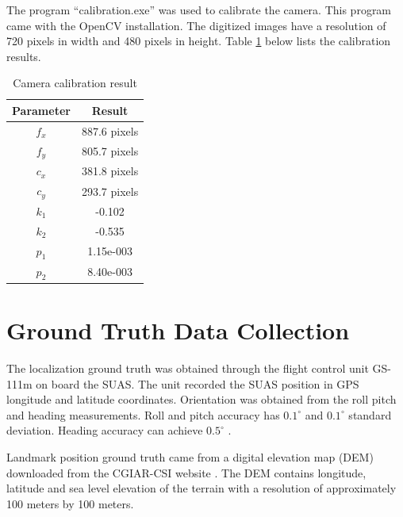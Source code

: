 The program ``calibration.exe'' was used to calibrate the camera. This
program came with the OpenCV installation. The digitized images have a
resolution of 720 pixels in width and 480 pixels in height. Table
\ref{tab:camcalresult} below lists the calibration results.

\begin{table}[h]
\caption{Camera calibration result}
\label{tab:camcalresult}
\centering
\begin{tabular}{|c|c|}
\hline
Parameter & Result\\ \hline
$f_x$ & 887.6 pixels \\ \hline
$f_y$ & 805.7 pixels\\ \hline
$c_x$ & 381.8 pixels\\ \hline
$c_y$ & 293.7 pixels\\ \hline
$k_1$ & -0.102 \\ \hline
$k_2$ & -0.535 \\ \hline
$p_1$ & 1.15e-003 \\ \hline
$p_2$ & 8.40e-003 \\
\hline
\end{tabular}
\end{table}
\FloatBarrier

\section{Ground Truth Data Collection}
The localization ground truth was obtained through the flight
control unit GS-111m on board the SUAS. The unit recorded the SUAS
position in GPS longitude and latitude coordinates. Orientation was
obtained from the roll pitch and heading measurements. Roll and pitch
accuracy has $0.1^\circ$ and $0.1^\circ$ standard deviation.
Heading accuracy can achieve $0.5^\circ$ \cite{_athena_????}.

Landmark position ground truth came from a digital elevation map (DEM)
downloaded from the CGIAR-CSI website \cite{_cgiar-csi_????}. The DEM
contains longitude, latitude and sea level elevation of the terrain
with a resolution of approximately 100 meters by 100 meters. 



